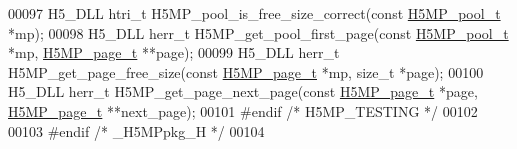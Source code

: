 \begin{DoxyCode}
00097 H5\_DLL htri\_t H5MP\_pool\_is\_free\_size\_correct(\textcolor{keyword}{const} \hyperlink{struct_h5_m_p__pool__t}{H5MP\_pool\_t} *mp);
00098 H5\_DLL herr\_t H5MP\_get\_pool\_first\_page(\textcolor{keyword}{const} \hyperlink{struct_h5_m_p__pool__t}{H5MP\_pool\_t} *mp, 
      \hyperlink{struct_h5_m_p__page__t}{H5MP\_page\_t} **page);
00099 H5\_DLL herr\_t H5MP\_get\_page\_free\_size(\textcolor{keyword}{const} \hyperlink{struct_h5_m_p__page__t}{H5MP\_page\_t} *mp, \textcolor{keywordtype}{size\_t} *page);
00100 H5\_DLL herr\_t H5MP\_get\_page\_next\_page(\textcolor{keyword}{const} \hyperlink{struct_h5_m_p__page__t}{H5MP\_page\_t} *page, 
      \hyperlink{struct_h5_m_p__page__t}{H5MP\_page\_t} **next\_page);
00101 \textcolor{preprocessor}{#endif }\textcolor{comment}{/* H5MP\_TESTING */}\textcolor{preprocessor}{}
00102 
00103 \textcolor{preprocessor}{#endif }\textcolor{comment}{/* \_H5MPpkg\_H */}\textcolor{preprocessor}{}
00104 
\end{DoxyCode}
